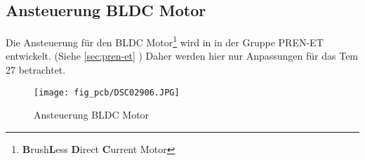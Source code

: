 \subsection{Ansteuerung BLDC Motor}
\label{sec:bldc}
Die Ansteuerung für den BLDC Motor\footnote{\textbf{B}rush\textbf{L}ess 
\textbf{D}irect \textbf{C}urrent Motor} wird in in der Gruppe PREN-ET 
entwickelt. (Siehe \ref{sec:pren-et} ) 
Daher werden hier nur Anpassungen für das Tem 27 betrachtet. 
\begin{figure}[h!]
    \centering
    \texttt{[image: fig\_pcb/DSC02906.JPG]}
    \caption{Ansteuerung BLDC Motor}
    \label{fig:dc}
\end{figure}
